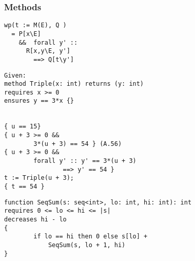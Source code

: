 \subsubsection{Methods} 
\begin{verbatim}
wp(t := M(E), Q )
  = P[x\E]
    &&  forall y' ::
      R[x,y\E, y'] 
        ==> Q[t\y']
\end{verbatim}
\begin{verbatim}
Given:
method Triple(x: int) returns (y: int)
requires x >= 0
ensures y == 3*x {}


{ u == 15}
{ u + 3 >= 0 &&
        3*(u + 3) == 54 } (A.56)
{ u + 3 >= 0 &&
        forall y' :: y' == 3*(u + 3)
                ==> y' == 54 }
t := Triple(u + 3);
{ t == 54 }

\end{verbatim}
\begin{verbatim}
function SeqSum(s: seq<int>, lo: int, hi: int): int
requires 0 <= lo <= hi <= |s|
decreases hi - lo
{
        if lo == hi then 0 else s[lo] +
            SeqSum(s, lo + 1, hi)
}
\end{verbatim}